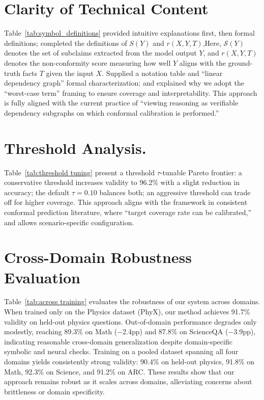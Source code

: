 \documentclass{uai2026} %
\theoremstyle{remark}
\theoremstyle{plain}
\theoremstyle{definition}
\begin{document}
\section{Clarity of Technical Content}
\label{app:notation}


Table~\ref{tab:symbol_definitions} provided intuitive explanations first, then formal definitions; completed the definitions of $S(Y)$ and $r(X,Y,T)$,Here, $\mathcal{S}(Y)$ denotes the set of subclaims extracted from the model output $Y$, and $r(X,Y,T)$ denotes the non-conformity score measuring how well $Y$ aligns with the ground-truth facts $T$ given the input $X$. Supplied a notation table and ``linear dependency graph'' formal characterization; and explained why we adopt the ``worst-case term'' framing to ensure coverage and interpretability. This approach is fully aligned with the current practice of ``viewing reasoning as verifiable dependency subgraphs on which conformal calibration is performed.''





\section{Threshold Analysis.}
Table~\ref{tab:threshold tuning} present a threshold $\tau$-tunable Pareto frontier: a conservative threshold increases validity to 96.2\% with a slight reduction in accuracy; the default $\tau = 0.10$ balances both; an aggressive threshold can trade off for higher coverage. This approach aligns with the framework in consistent conformal prediction literature, where ``target coverage rate can be calibrated,'' and allows scenario-specific configuration.



\section{Cross-Domain Robustness Evaluation}
Table~\ref{tab:across training} evaluates the robustness of our system across domains. When trained only on the Physics dataset (PhyX), our method achieves 91.7\% validity on held-out physics questions. Out-of-domain performance degrades only modestly, reaching 89.3\% on Math (−2.4pp) and 87.8\% on ScienceQA (−3.9pp), indicating reasonable cross-domain generalization despite domain-specific symbolic and neural checks. Training on a pooled dataset spanning all four domains yields consistently strong validity: 90.4\% on held-out physics, 91.8\% on Math, 92.3\% on Science, and 91.2\% on ARC. These results show that our approach remains robust as it scales across domains, alleviating concerns about brittleness or domain specificity.
\end{document}
